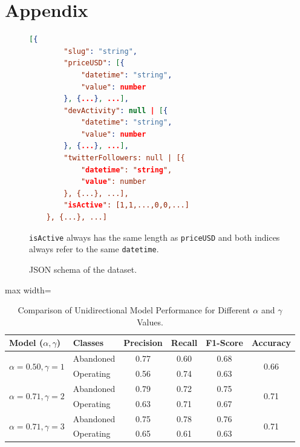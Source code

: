 \chapter{Appendix}


\begin{figure}[h!]
    \begin{lstlisting}[language=JSON]
    [{
    	"slug": "string",
    	"priceUSD": [{
    		"datetime": "string",
    		"value": number
    	}, {...}, ...],
    	"devActivity": null | [{
    		"datetime": "string",
    		"value": number
    	}, {...}, ...],
    	"twitterFollowers: null | [{
    		"datetime": "string",
    		"value": number
    	}, {...}, ...],
    	"isActive": [1,1,...,0,0,...]
    }, {...}, ...]
    \end{lstlisting}

    \caption{JSON schema of the dataset.}
    {\texttt{isActive} always has the same length as \texttt{priceUSD} and both indices always refer to the same \texttt{datetime}.}
    \label{fig:dataset_schema}
\end{figure}

\begin{table}[h]
    \centering
    \caption{Comparison of Unidirectional Model Performance for Different \(\alpha\) and \(\gamma\) Values.}
    \begin{adjustbox}{max width=\textwidth}
        \begin{tabular}{llcccc}
            \toprule
            \textbf{Model (\(\alpha, \gamma\))} & \textbf{Classes} & \textbf{Precision} & \textbf{Recall} & \textbf{F1-Score} & \textbf{Accuracy} \\
            \midrule
            \multirow{2}{*}{\(\alpha = 0.50, \gamma = 1\)} & Abandoned  & 0.77 & 0.60 & 0.68 & \multirow{2}{*}{0.66} \\ 
                                                        & Operating  & 0.56 & 0.74 & 0.63 &                     \\
            \midrule
            \multirow{2}{*}{\(\alpha = 0.71, \gamma = 2\)} & Abandoned  & 0.79 & 0.72 & 0.75 & \multirow{2}{*}{0.71} \\ 
                                                           & Operating  & 0.63 & 0.71 & 0.67 &                     \\
            \midrule
            \multirow{2}{*}{\(\alpha = 0.71, \gamma = 3\)} & Abandoned  & 0.75 & 0.78 & 0.76 & \multirow{2}{*}{0.71} \\ 
                                                           & Operating  & 0.65 & 0.61 & 0.63 &                     \\
            \bottomrule
        \end{tabular}
    \end{adjustbox}
    \label{tab:alpha_gamma_comparison}
\end{table}

